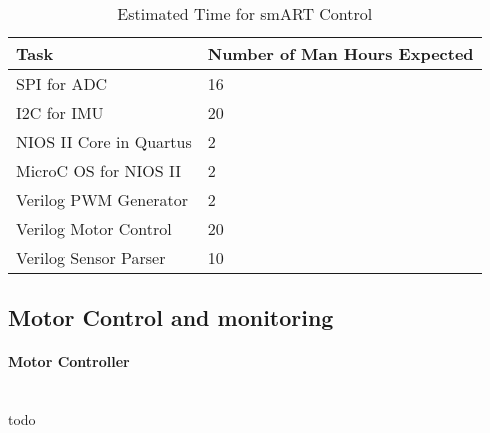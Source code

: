 \documentclass[12pt,article]{IEEEtran}
\begin{document}
    \begin{table}[H]    	
        \renewcommand{\arraystretch}{1.3}
    			\caption{Estimated Time for smART Control}
    			
    			\label{Estimated Time}
    			
    			\centering
    			\begin{tabular}{p{4cm}|p{4cm}}
    			\hline
    			\bfseries 	Task 			        	& \bfseries Number of Man Hours Expected        \\
    			\hline\hline
    						SPI for ADC 		        & 16						    	            \\
    						I2C for IMU    	        	& 20			                                \\	
    						NIOS II Core in Quartus	    & 2				                                \\	
    						MicroC OS for NIOS II   	& 2				                                \\
                            Verilog PWM Generator       & 2						                        \\
    						Verilog Motor Control    	& 20			                                \\	
    						Verilog Sensor Parser    	& 10				                            \\	
    					    \hline
    			\end{tabular}
		\end{table}

    \subsection{Motor Control and monitoring}
        \paragraph{Motor Controller}
        	\\todo
        
       
       
\end{document}
